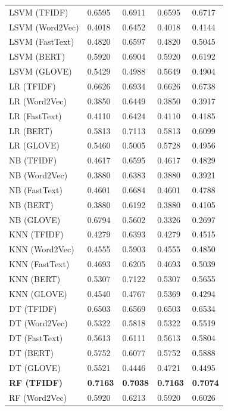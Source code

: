 \begin{longtable}{p{.40\linewidth} p{.11\linewidth}p{.11\linewidth}p{.11\linewidth}p{.11\linewidth}}
LSVM (TFIDF) & 0.6595 & 0.6911 & 0.6595 & 0.6717 \\
LSVM (Word2Vec) & 0.4018 & 0.6452 & 0.4018 & 0.4144 \\
LSVM (FastText) & 0.4820 & 0.6597 & 0.4820 & 0.5045 \\ %
LSVM (BERT) & 0.5920 & 0.6904 & 0.5920 & 0.6192 \\
LSVM (GLOVE) & 0.5429 & 0.4988 & 0.5649 & 0.4904 \\
LR (TFIDF) & 0.6626 & 0.6934 & 0.6626 & 0.6738 \\
LR (Word2Vec) & 0.3850 & 0.6449 & 0.3850 & 0.3917 \\
LR (FastText) & 0.4110 & 0.6424 & 0.4110 & 0.4185 \\
LR (BERT) & 0.5813 & 0.7113 & 0.5813 & 0.6099 \\
LR (GLOVE) & 0.5460 & 0.5005 & 0.5728 & 0.4956 \\
NB (TFIDF) & 0.4617 & 0.6595 & 0.4617 & 0.4829 \\
NB (Word2Vec) & 0.3880 & 0.6383 & 0.3880 & 0.3921 \\
NB (FastText) & 0.4601 & 0.6684 & 0.4601 & 0.4788 \\
NB (BERT) & 0.3880 & 0.6192 & 0.3880 & 0.4105 \\
NB (GLOVE) & 0.6794 & 0.5602 & 0.3326 & 0.2697 \\
KNN (TFIDF) & 0.4279 & 0.6393 & 0.4279 & 0.4515 \\
KNN (Word2Vec) & 0.4555 & 0.5903 & 0.4555 & 0.4850 \\
KNN (FastText) & 0.4693 & 0.6205 & 0.4693 & 0.5039 \\
KNN (BERT) & 0.5307 & 0.7122 & 0.5307 & 0.5655 \\
KNN (GLOVE) & 0.4540 & 0.4767 & 0.5369 & 0.4294 \\
DT (TFIDF) & 0.6503 & 0.6569 & 0.6503 & 0.6534 \\
DT (Word2Vec) & 0.5322 & 0.5818 & 0.5322 & 0.5519 \\
DT (FastText) & 0.5613 & 0.6111 & 0.5613 & 0.5804 \\
DT (BERT) & 0.5752 & 0.6077 & 0.5752 & 0.5888 \\
DT (GLOVE) & 0.5521 & 0.4446 & 0.4721 & 0.4495 \\
\textbf{RF (TFIDF)} & \textbf{0.7163} & \textbf{0.7038} & \textbf{0.7163} & \textbf{0.7074} \\
RF (Word2Vec) & 0.5920 & 0.6213 & 0.5920 & 0.6026 \\

\end{longtable}
